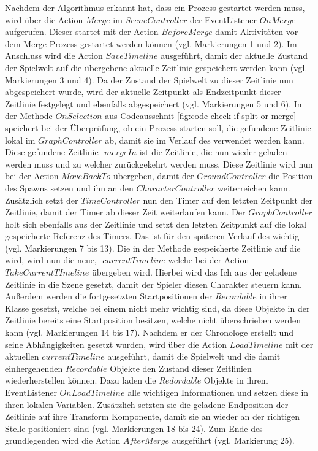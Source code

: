 Nachdem der Algorithmus erkannt hat, dass ein  Prozess gestartet werden muss, wird über die Action $Merge$ im $SceneController$ der EventListener $OnMerge$ aufgerufen. Dieser startet mit der Action $BeforeMerge$ damit Aktivitäten vor dem Merge Prozess gestartet werden können (vgl. Markierungen 1 und 2). Im Anschluss wird die Action $SaveTimeline$ ausgeführt, damit der aktuelle Zustand der Spielwelt auf die übergebene aktuelle Zeitlinie gespeichert werden kann (vgl. Markierungen 3 und 4). Da der Zustand der Spielwelt zu dieser Zeitlinie nun abgespeichert wurde, wird der aktuelle Zeitpunkt als Endzeitpunkt dieser Zeitlinie festgelegt und ebenfalls abgespeichert (vgl. Markierungen 5 und 6). In der Methode $OnSelection$ aus Codeausschnit \ref{fig:code-check-if-split-or-merge} speichert bei der Überprüfung, ob ein  Prozess starten soll, die gefundene Zeitlinie lokal im $GraphController$ ab, damit sie im Verlauf des  verwendet werden kann. Diese gefundene Zeitlinie $\_mergeIn$ ist die Zeitlinie, die nun wieder geladen werden muss und zu welcher zurückgekehrt werden muss. Diese Zeitlinie wird nun bei der Action $MoveBackTo$ übergeben, damit der $GroundController$ die Position des Spawns setzen und ihn an den $CharacterController$ weiterreichen kann. Zusätzlich setzt der $TimeController$ nun den Timer auf den letzten Zeitpunkt der Zeitlinie, damit der Timer ab dieser Zeit weiterlaufen kann. Der $GraphController$ holt sich ebenfalls aus der Zeitlinie und setzt den letzten Zeitpunkt auf die lokal gespeicherte Referenz des Timers. Das ist für den späteren Verlauf des  wichtig (vgl. Markierungen 7 bis 13). Die in der Methode gespeicherte Zeitlinie auf die  wird, wird nun die neue, $\_currentTimeline$ welche bei der Action $TakeCurrentTImeline$ übergeben wird. Hierbei wird das Ich aus der geladene Zeitlinie in die Szene gesetzt, damit der Spieler diesen Charakter steuern kann. Außerdem werden die fortgesetzten Startpositionen der $Recordable$ in ihrer Klasse gesetzt, welche bei einem  nicht mehr wichtig sind, da diese Objekte in der Zeitlinie bereits eine Startposition besitzen, welche nicht überschrieben werden kann (vgl. Markierungen 14 bis 17). Nachdem er der Chronologe erstellt und seine Abhängigkeiten gesetzt wurden, wird über die Action $LoadTimeline$ mit der aktuellen $currentTimeline$ ausgeführt, damit die Spielwelt und die damit einhergehenden $Recordable$ Objekte den Zustand dieser Zeitlinien wiederherstellen können. Dazu laden die $Redordable$ Objekte in ihrem EventListener $OnLoadTimeline$ alle wichtigen Informationen und setzen diese in ihren lokalen Variablen. Zusätzlich setzten sie die geladene Endposition der Zeitlinie auf ihre Transform Komponente, damit sie an wieder an der richtigen Stelle positioniert sind (vgl. Markierungen 18 bis 24). Zum Ende des grundlegenden  wird die Action $AfterMerge$ ausgeführt (vgl. Markierung 25).

